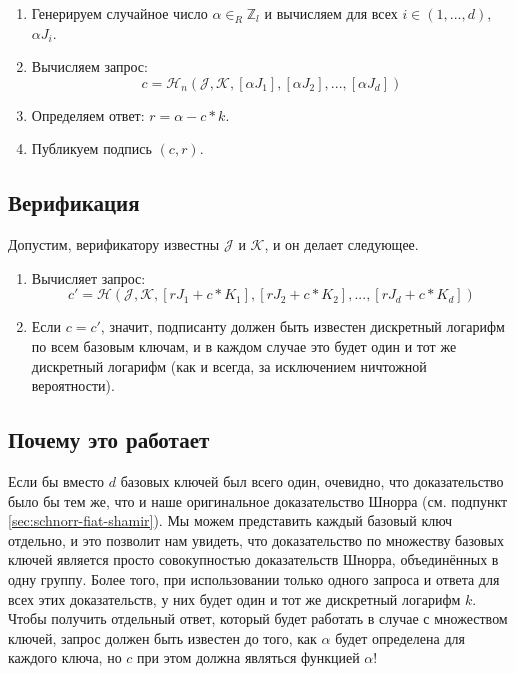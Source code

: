 \begin{enumerate}
	\item Генерируем случайное число $\alpha \in_R \mathbb{Z}_l$ и вычисляем для всех $i \in (1,...,d)$, $\alpha J_i$.
	\item Вычисляем запрос:\vspace{.175cm}
	\[c = \mathcal{H}_n(\mathcal{J},\mathcal{K},[\alpha J_1],[\alpha J_2],...,[\alpha J_d])\]
	\item Определяем ответ: $r = \alpha - c*k$.
	\item Публикуем подпись $(c, r)$.
\end{enumerate}


\subsection*{Верификация}

Допустим, верификатору известны $\mathcal{J}$ и $\mathcal{K}$, и он делает следующее.

\begin{enumerate}
	\item Вычисляет запрос:\vspace{.175cm}
	\[c' = \mathcal{H}(\mathcal{J},\mathcal{K},[r J_1 + c*K_1],[r J_2 + c*K_2],...,[r J_d + c*K_d])\]
	\item Если $c = c'$, значит, подписанту должен быть известен дискретный логарифм по всем базовым ключам, и в каждом случае это будет один и тот же дискретный логарифм (как и всегда, за исключением ничтожной вероятности).
\end{enumerate}


\subsection*{Почему это работает}

Если бы вместо $d$ базовых ключей был всего один, очевидно, что доказательство было бы тем же, что и наше оригинальное доказательство Шнорра (см. подпункт \ref{sec:schnorr-fiat-shamir}). Мы можем представить каждый базовый ключ отдельно, и это позволит нам увидеть, что доказательство по множеству базовых ключей является просто совокупностью доказательств Шнорра, объеди\-нённых в одну группу. Более того, при использовании только одного запроса и ответа для всех этих доказательств, у них будет один и тот же дискретный логарифм $k$. Чтобы получить отдельный ответ, который будет работать в случае с множеством ключей, запрос должен быть известен до того, как $\alpha$ будет определена для каждого ключа, но $c$ при этом должна являться функцией $\alpha$!



